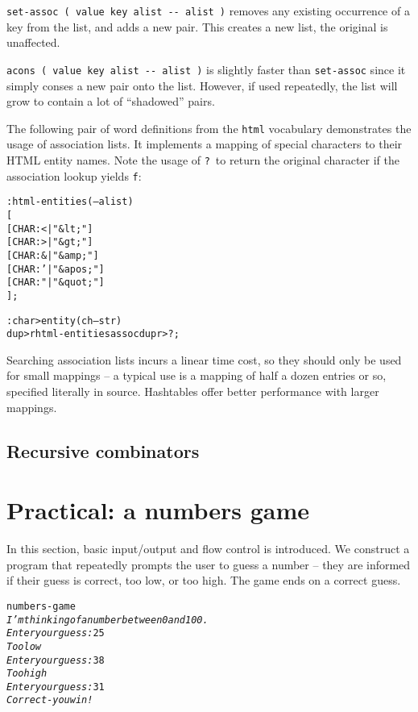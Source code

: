 \documentclass[english]{book}
\begin{document}
\texttt{set-assoc ( value key alist -{}- alist )} removes any existing
occurrence of a key from the list, and adds a new pair. This creates
a new list, the original is unaffected.

\texttt{acons ( value key alist -{}- alist )} is slightly faster
than \texttt{set-assoc} since it simply conses a new pair onto the
list. However, if used repeatedly, the list will grow to contain a
lot of {}``shadowed'' pairs.

The following pair of word definitions from the \texttt{html} vocabulary demonstrates the usage of association lists. It implements a mapping of special characters to their HTML entity names. Note the usage of \texttt{?}~to return the original character if the association lookup yields \texttt{f}:

\begin{alltt}
: html-entities ( -- alist )
    {[}
        {[} CHAR: < | "\&lt;"   {]}
        {[} CHAR: > | "\&gt;"   {]}
        {[} CHAR: \& | "\&amp;"  {]}
        {[} CHAR: {'} | "\&apos;" {]}
        {[} CHAR: {"} | "\&quot;" {]}
    {]} ;

: char>entity ( ch -- str )
    dup >r html-entities assoc dup r> ? ;
\end{alltt}

Searching association lists incurs a linear time cost, so they should
only be used for small mappings -- a typical use is a mapping of half
a dozen entries or so, specified literally in source. Hashtables offer
better performance with larger mappings.

\section{Recursive combinators}

\chapter{Practical: a numbers game}

In this section, basic input/output and flow control is introduced.
We construct a program that repeatedly prompts the user to guess a
number -- they are informed if their guess is correct, too low, or
too high. The game ends on a correct guess.

\begin{alltt}
numbers-game
\emph{I'm thinking of a number between 0 and 100.}
\emph{Enter your guess:} 25
\emph{Too low}
\emph{Enter your guess:} 38
\emph{Too high}
\emph{Enter your guess:} 31
\emph{Correct - you win!}
\end{alltt}
\end{document}
